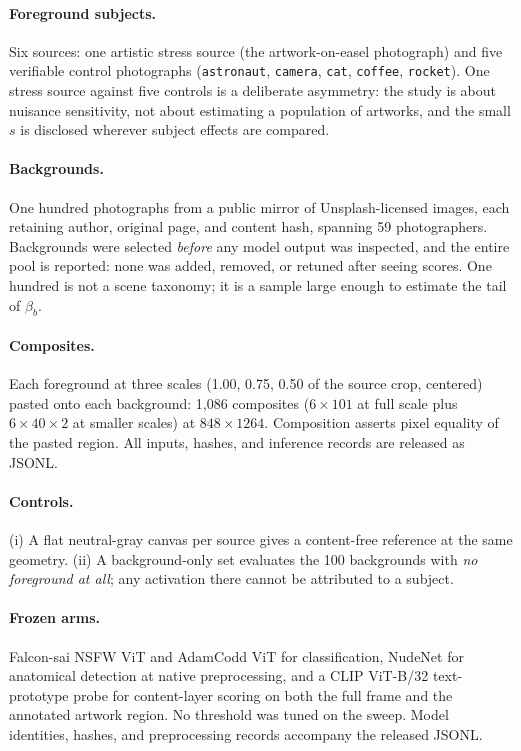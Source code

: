 \documentclass[11pt]{article}
\begin{document}
\paragraph{Foreground subjects.} Six sources: one artistic stress source (the artwork-on-easel photograph) and five verifiable control photographs (\texttt{astronaut}, \texttt{camera}, \texttt{cat}, \texttt{coffee}, \texttt{rocket}). One stress source against five controls is a deliberate asymmetry: the study is about nuisance sensitivity, not about estimating a population of artworks, and the small $s$ is disclosed wherever subject effects are compared.

\paragraph{Backgrounds.} One hundred photographs from a public mirror of Unsplash-licensed images, each retaining author, original page, and content hash, spanning 59 photographers. Backgrounds were selected \emph{before} any model output was inspected, and the entire pool is reported: none was added, removed, or retuned after seeing scores. One hundred is not a scene taxonomy; it is a sample large enough to estimate the tail of $\beta_b$.

\paragraph{Composites.} Each foreground at three scales (1.00, 0.75, 0.50 of the source crop, centered) pasted onto each background: 1{,}086 composites ($6\times101$ at full scale plus $6\times40\times2$ at smaller scales) at $848\times1264$. Composition asserts pixel equality of the pasted region. All inputs, hashes, and inference records are released as JSONL.

\paragraph{Controls.} (i) A flat neutral-gray canvas per source gives a content-free reference at the same geometry. (ii) A background-only set evaluates the 100 backgrounds with \emph{no foreground at all}; any activation there cannot be attributed to a subject.

\paragraph{Frozen arms.} Falcon-sai NSFW ViT and AdamCodd ViT for classification, NudeNet for anatomical detection at native preprocessing, and a CLIP ViT-B/32 text-prototype probe for content-layer scoring on both the full frame and the annotated artwork region. No threshold was tuned on the sweep. Model identities, hashes, and preprocessing records accompany the released JSONL.
\end{document}
